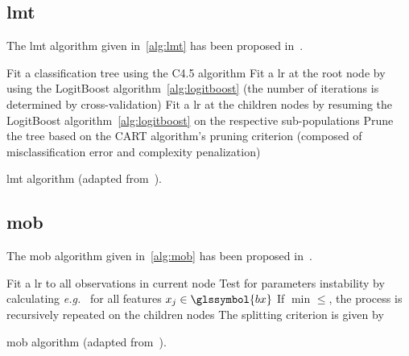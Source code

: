 \subsection{\gls{lmt}} \label{app1:sec_lmt}

The \gls{lmt} algorithm given in~\eqref{alg:lmt} has been proposed in~\cite{landwehr2005logistic}.

\begin{algorithm}[H]
 \KwResult{$ $}
 Fit a classification tree using the C4.5 algorithm\;
 Fit a \gls{lr} at the root node by using the LogitBoost algorithm~\ref{alg:logitboost} (the number of iterations is determined by cross-validation)\;
 Fit a \gls{lr} at the children nodes by resuming the LogitBoost algorithm~\ref{alg:logitboost} on the respective sub-populations\;
 Prune the tree based on the CART algorithm's pruning criterion (composed of misclassification error and complexity penalization)\;
 \caption{\label{alg:lmt} \gls{lmt} algorithm (adapted from~\cite{landwehr2005logistic}).}
\end{algorithm}

\subsection{\gls{mob}} \label{app1:sec_mob}

The \gls{mob} algorithm given in~\eqref{alg:mob} has been proposed in~\cite{zeileis2008model}.

\begin{algorithm}[H]
 \KwResult{$ $}
 Fit a \gls{lr} to all observations in current node\;
 Test for parameters instability by calculating \textit{e.g.}\ $ $ for all features $x_j \in \glssymbol{bx}$\;
 If $\min_{} \leq  $, the process is recursively repeated on the children nodes\;
 The splitting criterion is given by \;
 \caption{\label{alg:mob} \gls{mob} algorithm (adapted from~\cite{zeileis2008model}).}
\end{algorithm}

\printbibliography[heading=subbibliography, title=References of Appendix A]
